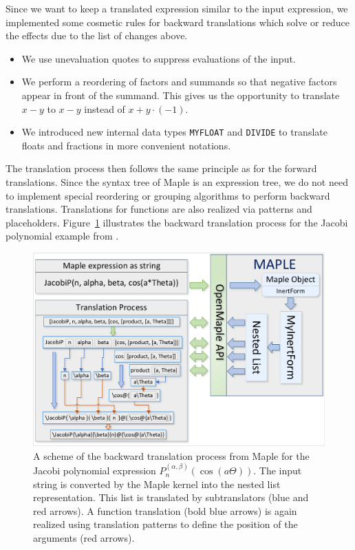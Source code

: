\documentclass[a4paper,11pt]{article}
\newcommand{\Maple}{Maple}
\theoremstyle{defTheoStyle}
\theoremstyle{defExampStyle}
\begin{document}
	Since we want to keep a translated expression similar to the input expression, we implemented some cosmetic rules 
	for backward translations which solve or reduce the effects due to the list of changes above. 
	\begin{itemize}
		\item We use unevaluation quotes to suppress evaluations of the input.
		\item We perform a reordering of factors and summands so that negative factors appear in front of the summand. This gives us the opportunity to translate $x - y$ to $x - y$ instead of $x + y \cdot (-1)$.
		\item We introduced new internal data types \texttt{MYFLOAT} and \texttt{DIVIDE} to translate floats and fractions in more convenient notations.
	\end{itemize}
	
	The translation process then follows the same principle as for the forward translations. Since the syntax tree of \Maple{} is an expression tree, we do not need to implement special reordering or grouping algorithms to perform backward translations. Translations for functions are also realized via patterns and placeholders. Figure~\ref{fig:backward-trans} illustrates the backward translation process for the Jacobi polynomial example from .
	
	\begin{figure}[t!]
		\centering
		\includegraphics[clip, trim=0.1cm 0.1cm 0.1cm 0.1cm, scale=0.7]{MapleTranslation.pdf}
		\caption{A scheme of the backward translation process from \Maple{} for the Jacobi polynomial expression $P_n^{(\alpha , \beta)}(\cos(a\Theta))$. The input string is converted by the \Maple{} kernel into the nested list representation. This list is translated by subtranslators (blue and red arrows). A function translation (bold blue arrows) is again realized using translation patterns to define the position of the arguments (red arrows).}
		\label{fig:backward-trans}
	\end{figure}
	
\end{document}
